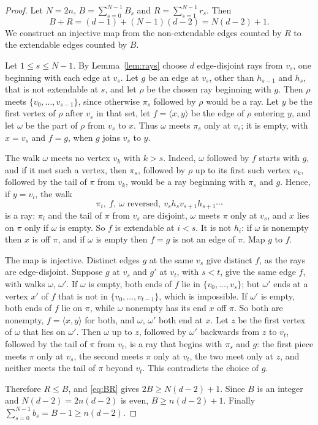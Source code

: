 \documentclass[11pt]{amsart}
\theoremstyle{remark}
\begin{document}
\begin{proof}
Let $N=2n$, $B=\sum_{s=0}^{N-1}B_s$ and $R=\sum_{s=1}^{N-1}r_s$. Then
\begin{equation}\label{eq:BR}
B+R=(d-1)+(N-1)(d-2)=N(d-2)+1.
\end{equation}
We construct an injective map from the non-extendable edges counted by $R$ to the extendable edges counted by $B$.

Let $1\le s\le N-1$. By Lemma~\ref{lem:rays} choose $d$ edge-disjoint rays from $v_s$, one beginning with each edge at
$v_s$. Let $g$ be an edge at $v_s$, other than $h_{s-1}$ and $h_s$, that is not extendable at $s$, and let $\rho$ be
the chosen ray beginning with $g$. Then $\rho$ meets $\{v_0,\dots,v_{s-1}\}$, since otherwise $\pi_s$ followed by
$\rho$ would be a ray. Let $y$ be the first vertex of $\rho$ after $v_s$ in that set, let $f=\langle x,y\rangle$ be the
edge of $\rho$ entering $y$, and let $\omega$ be the part of $\rho$ from $v_s$ to $x$. Thus $\omega$ meets $\pi_s$ only
at $v_s$; it is empty, with $x=v_s$ and $f=g$, when $g$ joins $v_s$ to $y$.

The walk $\omega$ meets no vertex $v_k$ with $k>s$. Indeed, $\omega$ followed by $f$ starts with $g$, and if it met
such a vertex, then $\pi_s$, followed by $\rho$ up to its first such vertex $v_k$, followed by the tail of $\pi$ from
$v_k$, would be a ray beginning with $\pi_s$ and $g$. Hence, if $y=v_i$, the walk
\[
\pi_i,\ f,\ \omega\text{ reversed},\ v_s h_s v_{s+1}h_{s+1}\cdots
\]
is a ray: $\pi_i$ and the tail of $\pi$ from $v_s$ are disjoint, $\omega$ meets $\pi$ only at $v_s$, and $x$ lies on
$\pi$ only if $\omega$ is empty. So $f$ is extendable at $i<s$. It is not $h_i$: if $\omega$ is nonempty then $x$ is
off $\pi$, and if $\omega$ is empty then $f=g$ is not an edge of $\pi$. Map $g$ to $f$.

The map is injective. Distinct edges $g$ at the same $v_s$ give distinct $f$, as the rays are edge-disjoint. Suppose
$g$ at $v_s$ and $g'$ at $v_t$, with $s<t$, give the same edge $f$, with walks $\omega$, $\omega'$. If $\omega$ is
empty, both ends of $f$ lie in $\{v_0,\dots,v_s\}$; but $\omega'$ ends at a vertex $x'$ of $f$ that is not in
$\{v_0,\dots,v_{t-1}\}$, which is impossible. If $\omega'$ is empty, both ends of $f$ lie on $\pi$, while $\omega$
nonempty has its end $x$ off $\pi$. So both are nonempty, $f=\langle x,y\rangle$ for both, and $\omega$, $\omega'$
both end at $x$. Let $z$ be the first vertex of $\omega$ that lies on $\omega'$. Then $\omega$ up to $z$, followed by
$\omega'$ backwards from $z$ to $v_t$, followed by the tail of $\pi$ from $v_t$, is a ray that begins with $\pi_s$ and
$g$: the first piece meets $\pi$ only at $v_s$, the second meets $\pi$ only at $v_t$, the two meet only at $z$, and
neither meets the tail of $\pi$ beyond $v_t$. This contradicts the choice of $g$.

Therefore $R\le B$, and \eqref{eq:BR} gives $2B\ge N(d-2)+1$. Since $B$ is an integer and $N(d-2)=2n(d-2)$ is even,
$B\ge n(d-2)+1$. Finally $\sum_{s=0}^{N-1}b_s=B-1\ge n(d-2)$.
\end{proof}
\end{document}
